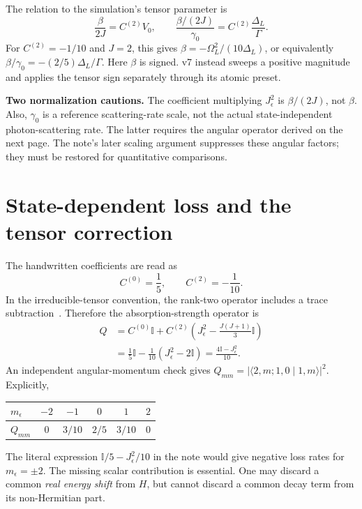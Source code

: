 \documentclass[11pt,letterpaper]{article}
\newcommand{\id}{\mathbb{I}}
\newcommand{\Je}{J_{\epsilon}}
\begin{document}
The relation to the simulation's tensor parameter is
\begin{equation}
\boxed{
\frac{\beta}{2J}=C^{(2)}V_0,
\qquad
\frac{\beta/(2J)}{\gamma_0}=C^{(2)}\frac{\Delta_L}{\Gamma}.
}
\label{eq:beta}
\end{equation}
For $C^{(2)}=-1/10$ and $J=2$, this gives
$\beta=-\Omega_L^2/(10\Delta_L)$, or equivalently
$\beta/\gamma_0=-(2/5)\Delta_L/\Gamma$.
Here $\beta$ is signed. v7 instead sweeps a positive magnitude and applies the
tensor sign separately through its atomic preset.

\textbf{Two normalization cautions.} The coefficient multiplying $\Je^2$ is
$\beta/(2J)$, not $\beta$. Also, $\gamma_0$ is a reference scattering-rate
scale, not the actual state-independent photon-scattering rate. The latter
requires the angular operator derived on the next page. The note's later
scaling argument suppresses these angular factors; they must be restored for
quantitative comparisons.

\newpage
\section{State-dependent loss and the tensor correction}

The handwritten coefficients are read as
\begin{equation}
C^{(0)}=\frac15,\qquad C^{(2)}=-\frac1{10}.
\end{equation}
In the irreducible-tensor convention, the rank-two operator includes a trace
subtraction~\cite{deutsch}. Therefore the absorption-strength operator is
\begin{align}
Q&=C^{(0)}\id+C^{(2)}
\left(\Je^2-\frac{J(J+1)}{3}\id\right)\nonumber\\
&=\frac15\id-\frac1{10}(\Je^2-2\id)
=\boxed{\frac{4\id-\Je^2}{10}}.
\label{eq:Q}
\end{align}
An independent angular-momentum check gives
$Q_{mm}=|\langle 2,m;1,0\mid1,m\rangle|^2$. Explicitly,
\begin{center}
\begin{tabular}{@{}lccccc@{}}
\toprule
$m_\epsilon$ & $-2$ & $-1$ & $0$ & $1$ & $2$\\
\midrule
$Q_{mm}$ & $0$ & $3/10$ & $2/5$ & $3/10$ & $0$\\
\bottomrule
\end{tabular}
\end{center}

The literal expression $\id/5-\Je^2/10$ in the note would give negative loss
rates for $m_\epsilon=\pm2$. The missing scalar contribution is essential.
One may discard a common \emph{real energy shift} from $H$, but cannot discard
a common decay term from its non-Hermitian part.
\end{document}
